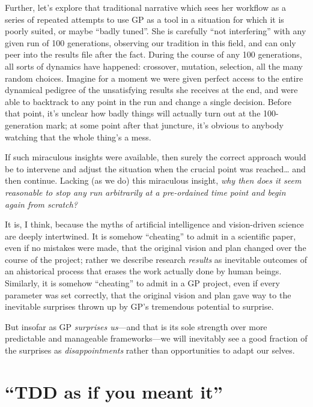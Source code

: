Further, let's explore that traditional narrative which sees her workflow as a series of repeated attempts to use GP as a tool in a situation for which it is poorly suited, or maybe ``badly tuned''. She is carefully ``not interfering'' with any given run of 100 generations, observing our tradition in this field, and can only peer into the results file after the fact. During the course of any 100 generations, all sorts of dynamics have happened: crossover, mutation, selection, all the many random choices. Imagine for a moment we were given perfect access to the entire dynamical pedigree of the unsatisfying results she receives at the end, and were able to backtrack to any point in the run and change a single decision. Before that point, it's unclear how badly things will actually turn out at the 100-generation mark; at some point after that juncture, it's obvious to anybody watching that the whole thing's a mess.

If such miraculous insights were available, then surely the correct approach would be to intervene and adjust the situation when the crucial point was reached\ldots{} and then continue. Lacking (as we do) this miraculous insight, \emph{why then does it seem reasonable to stop any run arbitrarily at a pre-ordained time point and begin again from scratch?}

It is, I think, because the myths of artificial intelligence and vision-driven science are deeply intertwined. It is somehow ``cheating'' to admit in a scientific paper, even if no mistakes were made, that the original vision and plan changed over the course of the project; rather we describe research \emph{results} as inevitable outcomes of an ahistorical process that erases the work actually done by human beings. Similarly, it is somehow ``cheating'' to admit in a GP project, even if every parameter was set correctly, that the original vision and plan gave way to the inevitable surprises thrown up by GP's tremendous potential to surprise.

But insofar as GP \emph{surprises us}---and that is its sole strength over more predictable and manageable frameworks---we will inevitably see a good fraction of the surprises as \emph{disappointments} rather than opportunities to adapt our selves.

\section{``TDD as if you meant it''}\hypertarget{tdd-as-if-you-meant-it}{}\label{tdd-as-if-you-meant-it}

